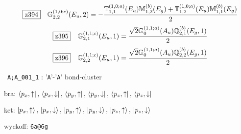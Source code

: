 \documentclass[fleqn,10pt,landscape]{jsarticle}
\begin{document}
\begin{dmath*}
\hspace*{3mm}\fbox{z394}\quad \mathbb{G}_{2,2}^{(1,0;c)}(E_{u},2)=- \frac{\mathbb{T}_{1,1}^{(1,0;a)}(E_{u}) \mathbb{M}_{1,2}^{(b)}(E_{g}) + \mathbb{T}_{1,2}^{(1,0;a)}(E_{u}) \mathbb{M}_{1,1}^{(b)}(E_{g})}{2}
\end{dmath*}
\begin{dmath*}
\hspace*{3mm}\fbox{z395}\quad \mathbb{G}_{2,1}^{(1,1;c)}(E_{u},1)=\frac{\sqrt{2} \mathbb{G}_{0}^{(1,1;a)}(A_{u}) \mathbb{Q}_{2,1}^{(b)}(E_{g},1)}{2}
\end{dmath*}
\begin{dmath*}
\hspace*{3mm}\fbox{z396}\quad \mathbb{G}_{2,2}^{(1,1;c)}(E_{u},1)=\frac{\sqrt{2} \mathbb{G}_{0}^{(1,1;a)}(A_{u}) \mathbb{Q}_{2,2}^{(b)}(E_{g},1)}{2}
\end{dmath*}
\vspace{5mm}

\noindent\textbullet\, \texttt{A;A_001_1} : '\texttt{A}'-'\texttt{A}' bond-cluster

\noindent\quad * bra: $\bra{p_{x},\uparrow},\, \bra{p_{x},\downarrow},\, \bra{p_{y},\uparrow},\, \bra{p_{y},\downarrow},\, \bra{p_{z},\uparrow},\, \bra{p_{z},\downarrow}$

\noindent\quad * ket: $\ket{p_{x},\uparrow},\, \ket{p_{x},\downarrow},\, \ket{p_{y},\uparrow},\, \ket{p_{y},\downarrow},\, \ket{p_{z},\uparrow},\, \ket{p_{z},\downarrow}$

\noindent\quad * wyckoff: \texttt{6a@6g}
\end{document}
